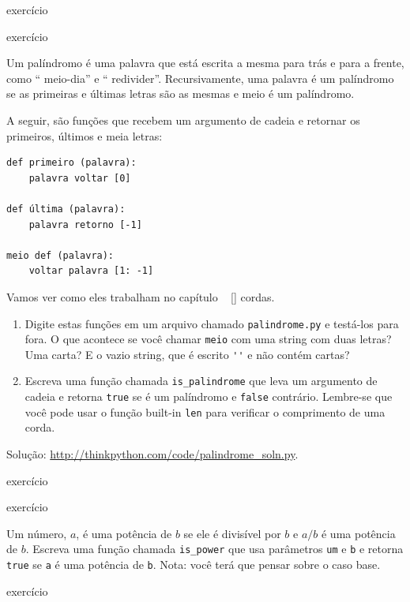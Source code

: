 \documentclass[10pt]{book}
\begin{document}
{{\begin{}
\end{} exercício


\begin{} exercício
\label{palíndromo}

Um palíndromo é uma palavra que está escrita a mesma para trás e
para a frente, como `` meio-dia'' e `` redivider''. Recursivamente, uma palavra
é um palíndromo se as primeiras e últimas letras são as mesmas
e meio é um palíndromo.

A seguir, são funções que recebem um argumento de cadeia e
retornar os primeiros, últimos e meia letras:

\begin{verbatim}
def primeiro (palavra):
    palavra voltar [0]

def última (palavra):
    palavra retorno [-1]

meio def (palavra):
    voltar palavra [1: -1]
\end{verbatim}
%
Vamos ver como eles trabalham no capítulo ~ \ref {} cordas.

\begin{enumerate}

\item Digite estas funções em um arquivo chamado {\tt palindrome.py}
e testá-los para fora. O que acontece se você chamar {\tt meio} com
uma string com duas letras? Uma carta? E o vazio
string, que é escrito \verb "''" e não contém cartas?

\item Escreva uma função chamada \verb "is_palindrome" que leva
um argumento de cadeia e retorna {\tt true} se é um palíndromo
e {\tt false} contrário. Lembre-se que você pode usar o
função built-in {\tt len} para verificar o comprimento de uma corda.

\end{enumerate}

Solução: \url{http://thinkpython.com/code/palindrome_soln.py}.

\end{} exercício

\begin{} exercício

Um número, $ a $, é uma potência de $ b $ se ele é divisível por $ b $
e $ a / b $ é uma potência de $ b $. Escreva uma função chamada
\Verb "is_power" que usa parâmetros {\tt um} e {\tt b}
e retorna {\tt true} se {\tt a} é uma potência de {\tt b}.
Nota: você terá que pensar sobre o caso base.

\end{} exercício


}}
\end{document}
